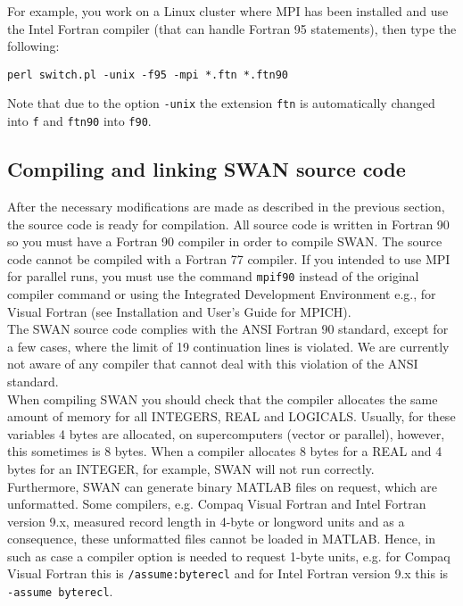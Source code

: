 \documentclass[12pt]{book}
\begin{document}
\noindent
For example, you work on a Linux cluster where MPI has been installed and use the Intel Fortran
compiler (that can handle Fortran 95 statements), then type the following:
\begin{verbatim}
perl switch.pl -unix -f95 -mpi *.ftn *.ftn90
\end{verbatim}
Note that due to the option {\tt -unix} the extension {\tt ftn} is automatically changed into {\tt f}
and {\tt ftn90} into {\tt f90}.

\subsection{Compiling and linking SWAN source code}

After the necessary modifications are made as described in the previous section, the source code is
ready for compilation. All source code is written in Fortran 90 so you must have a
Fortran 90 compiler in order to compile SWAN. The source code cannot be compiled with a Fortran 77
compiler. If you intended to use MPI for parallel runs, you must use the command {\tt mpif90} instead
of the original compiler command or using the Integrated Development Environment e.g., for Visual
Fortran (see Installation and User's Guide for MPICH).
\\[2ex]
\noindent
The SWAN source code complies with the ANSI Fortran 90 standard, except for a few cases, where
the limit of 19 continuation lines is violated. We are currently not aware of any compiler that cannot
deal with this violation of the ANSI standard.
\\[2ex]
\noindent
When compiling SWAN you should check that the compiler allocates the same amount of memory
for all {\scriptsize INTEGERS}, {\scriptsize REAL} and {\scriptsize LOGICALS}. Usually, for these
variables 4 bytes are allocated, on supercomputers (vector or parallel), however, this sometimes
is 8 bytes. When a compiler allocates 8 bytes for a {\scriptsize REAL} and 4 bytes for an
{\scriptsize INTEGER}, for example, SWAN will not run correctly.
\\[2ex]
\noindent
Furthermore, SWAN can generate binary MATLAB files on request, which are unformatted. Some compilers,
e.g. Compaq Visual Fortran and Intel Fortran version 9.x, measured record length in 4-byte or longword units and
as a consequence, these unformatted files cannot be loaded in MATLAB. Hence, in such as case a
compiler option is needed to request 1-byte units, e.g. for Compaq Visual Fortran this is
{\tt /assume:byterecl} and for Intel Fortran version 9.x this is {\tt -assume byterecl}.
\end{document}

